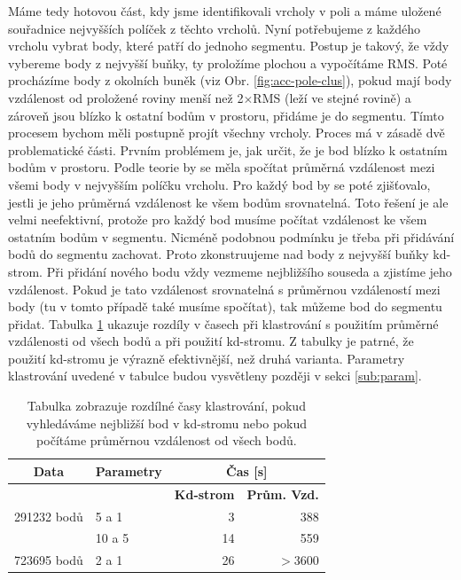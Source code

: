 \documentclass[11pt,twoside,a4paper]{book}
\begin{document}
Máme tedy hotovou část, kdy jsme identifikovali vrcholy v poli a máme uložené souřadnice nejvyšších políček z těchto vrcholů. Nyní potřebujeme z každého vrcholu vybrat body, které patří do jednoho segmentu. Postup je takový, že vždy vybereme body z nejvyšší buňky, ty proložíme plochou a vypočítáme RMS. Poté procházíme body z okolních buněk (viz Obr. \ref{fig:acc-pole-clus}), pokud mají body vzdálenost od proložené roviny menší než 2$\times$RMS (leží ve stejné rovině) a zároveň jsou blízko k ostatní bodům v prostoru, přidáme je do segmentu. Tímto procesem bychom měli postupně projít všechny vrcholy. Proces má v zásadě dvě problematické části. Prvním problémem je, jak určit, že je bod blízko k ostatním bodům v prostoru. Podle teorie by se měla spočítat průměrná vzdálenost mezi všemi body v nejvyšším políčku vrcholu. Pro každý bod by se poté zjišťovalo, jestli je jeho průměrná vzdálenost ke všem bodům srovnatelná. Toto řešení je ale velmi neefektivní, protože pro každý bod musíme počítat vzdálenost ke všem ostatním bodům v segmentu. Nicméně podobnou podmínku je třeba při přidávání bodů do segmentu zachovat. Proto zkonstruujeme nad body z nejvyšší buňky kd-strom. Při přidání nového bodu vždy vezmeme nejbližšího souseda a zjistíme jeho vzdálenost. Pokud je tato vzdálenost srovnatelná s průměrnou vzdáleností mezi body (tu v tomto případě také musíme spočítat), tak můžeme bod do segmentu přidat. Tabulka \ref{table:podminka-vzdalenosti} ukazuje rozdíly v časech při klastrování s použitím průměrné vzdálenosti od všech bodů a při použití kd-stromu. Z tabulky je patrné, že použití kd-stromu je výrazně efektivnější, než druhá varianta. Parametry klastrování uvedené v tabulce budou vysvětleny později v sekci \ref{sub:param}.

\begin{table}[ht]
\begin{tabular}{|c|l|r|r|}
\hline
\multicolumn{ 1}{|c|}{\textbf{Data}} & \multicolumn{ 1}{c|}{\textbf{Parametry}} & \multicolumn{ 2}{c|}{\textbf{Čas [s]}} \\ \hline
\multicolumn{ 1}{|l|}{} & \multicolumn{ 1}{l|}{} & \multicolumn{1}{l|}{\textbf{Kd-strom}} & \multicolumn{1}{l|}{\textbf{Prům. Vzd.}} \\ \hline
\multicolumn{ 1}{|c|}{291232 bodů} & 5 a 1 & 3 & 388 \\ \hline
\multicolumn{ 1}{|l|}{} & 10 a 5 & 14 & 559 \\ \hline
723695 bodů & 2 a 1 & 26 & $>$3600 \\ \hline
\end{tabular}

\caption{Tabulka zobrazuje rozdílné časy klastrování, pokud vyhledáváme nejbližší bod v kd-stromu nebo pokud počítáme průměrnou vzdálenost od všech bodů.} 
\label{table:podminka-vzdalenosti}
\end{table}
\end{document}
